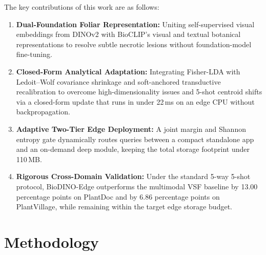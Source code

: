 \documentclass[conference]{IEEEtran}
\begin{document}
The key contributions of this work are as follows:
\begin{enumerate}
    \item \textbf{Dual-Foundation Foliar Representation:} Uniting self-supervised visual embeddings from DINOv2 \cite{oquab2023dinov2} with BioCLIP's \cite{stevens2024bioclip} visual and textual botanical representations to resolve subtle necrotic lesions without foundation-model fine-tuning.
    \item \textbf{Closed-Form Analytical Adaptation:} Integrating Fisher-LDA \cite{fisher1936use} with Ledoit--Wolf covariance shrinkage \cite{ledoit2004well} and soft-anchored transductive recalibration to overcome high-dimensionality issues and 5-shot centroid shifts via a closed-form update that runs in under 22\,ms on an edge CPU without backpropagation.
    \item \textbf{Adaptive Two-Tier Edge Deployment:} A joint margin and Shannon entropy \cite{shannon1948mathematical} gate dynamically routes queries between a compact standalone app and an on-demand deep module, keeping the total storage footprint under 110\,MB.
    \item \textbf{Rigorous Cross-Domain Validation:} Under the standard 5-way 5-shot protocol, BioDINO-Edge outperforms the multimodal VSF \cite{zhou2026vsf} baseline by 13.00 percentage points on PlantDoc and by 6.86 percentage points on PlantVillage, while remaining within the target edge storage budget.
\end{enumerate}

\section{Methodology}
\label{sec:architecture}
\end{document}
